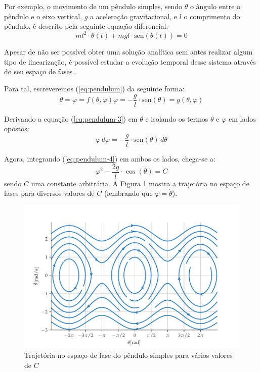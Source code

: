 \documentclass[a4paper, 12pt]{article}
\newcommand{\sen}{\text{sen}}
\begin{document}
Por exemplo, o movimento de um pêndulo simples, sendo $\theta$ o ângulo entre o pêndulo e o eixo vertical, $g$ a aceleração gravitacional, e $l$ o comprimento do pêndulo, é descrito pela seguinte equação diferencial:
\begin{equation}\label{eq:pendulum}
m l^2 \cdot \ddot{\theta}(t) + mgl\cdot  \sen(\theta(t)) = 0
\end{equation}

Apesar de não ser possível obter uma solução analítica sem antes realizar algum tipo de linearização, é possível estudar a evolução temporal desse sistema através do seu espaço de fases \cite{fiedler1994caos}.

Para tal, escreveremos (\ref{eq:pendulum}) da seguinte forma:
\begin{subequations}
\begin{equation}\label{eq:pendulum-2}
\dot{\theta} = \varphi = f(\theta, \varphi)
\end{equation}
\begin{equation}\label{eq:pendulum-3}
\dot{\varphi} = -\frac{g}{l} \cdot \sen(\theta) = g(\theta, \varphi)
\end{equation}
\end{subequations}

Derivando a equação (\ref{eq:pendulum-3}) em $\theta$ e isolando os termos $\theta$ e $\varphi$ em lados opostos:
\begin{equation}\label{eq:pendulum-4}
\varphi \, d\varphi = -\frac{g}{l} \cdot \sen(\theta) \, d\theta
\end{equation}

Agora, integrando (\ref{eq:pendulum-4}) em ambos os lados, chega-se a:
\begin{equation}
\varphi^2 - \frac{2g}{l} \cdot \cos(\theta) = C
\end{equation}
sendo $C$ uma constante arbitrária. A Figura \ref{fig:pendulum-phase-space} mostra a trajetória no espaço de fases para diversos valores de $C$ (lembrando que $\varphi = \dot{\theta}$).
\begin{figure}[!ht]
\centering
\includegraphics[scale = 0.7]{pendulum-phase-space.pdf}
\caption{Trajetória no espaço de fase do pêndulo simples para vários valores de $C$}
\label{fig:pendulum-phase-space}
\end{figure}
\end{document}
